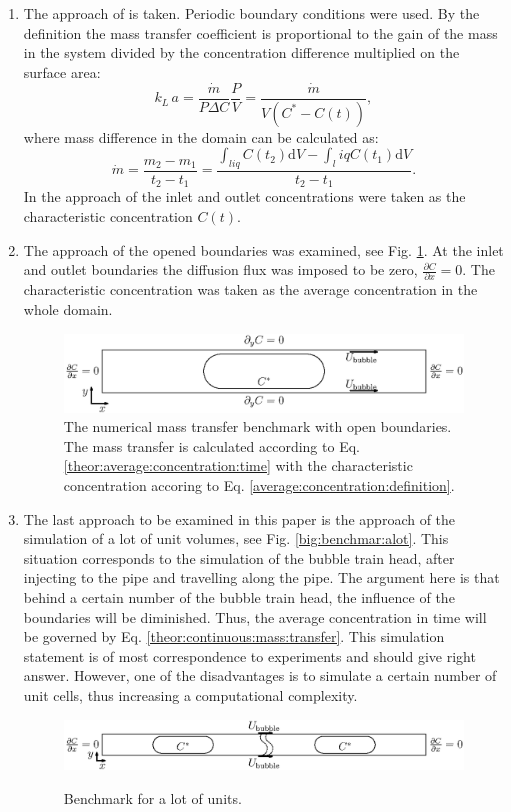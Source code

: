 \documentclass{article}
\newcommand{\beq}{\begin{equation}}
\newcommand{\feq}{\end{equation}}
\newcommand{\vol}{k_L\,a}
\newcommand{\cstar}{C^{*}}
\begin{document}
\begin{enumerate}
\item
The approach of \citet{vanbaten-circular} is taken. Periodic boundary conditions were used. By the
definition the mass transfer coefficient is
proportional to the gain of the mass in the system divided by the concentration difference
multiplied on the surface area:
\beq
\vol=\frac{\dot{m}}{P \Delta C}\frac{P}{V}=\frac{\dot{m}}{V (\cstar-C(t))},
\feq
where mass difference in the domain can be calculated as:
\beq
\dot{m}=\frac{m_2-m_1}{t_2-t_1}=\frac{\int_{liq}{C(t_2)\mathrm{d}V}-\int_liq{C(t_1)\mathrm{d}V}}{
t_2-t_1 } .
\feq
In the approach of \citet{vanbaten-circular} the inlet and outlet concentrations were taken as the
characteristic concentration $C(t)$.

\item 
The approach of the opened boundaries was examined, see Fig. \ref{fig:benchmark:jos}. At the inlet
and outlet boundaries the diffusion flux was imposed to be zero, $\frac{\partial C}{\partial x}=0$.
The characteristic concentration was taken as the average concentration in the whole domain.
\begin{figure}
\includegraphics[width=\textwidth]{Figures/benchmark_jos.eps}
\caption{The numerical mass transfer benchmark with open boundaries. The mass transfer is
calculated according to Eq. \ref{theor:average:concentration:time} with the characteristic
concentration accoring to Eq. \ref{average:concentration:definition}. \label{fig:benchmark:jos}}
\end{figure}

\item 
The last approach to be examined in this paper is the approach of the simulation of a lot of unit
volumes, see Fig. \ref{big:benchmar:alot}. This situation corresponds to the simulation of the
bubble train head, after injecting to the pipe and travelling along the pipe. The argument here is
that behind a certain number of the bubble train head, the influence of the boundaries will be
diminished. Thus, the average concentration in time will be governed by Eq.
\ref{theor:continuous:mass:transfer}. This simulation statement is of most correspondence to
experiments and should give right answer. However, one of the
disadvantages is to simulate a certain number of unit cells, thus increasing a computational
complexity.
\begin{figure}[htb!]
\includegraphics[width=\textwidth]{Figures/benchmark_alot.eps}\\
\caption{Benchmark for a lot of units. \label{fig:benchmark:alot}}
\end{figure}
\end{enumerate} 
\end{document}
